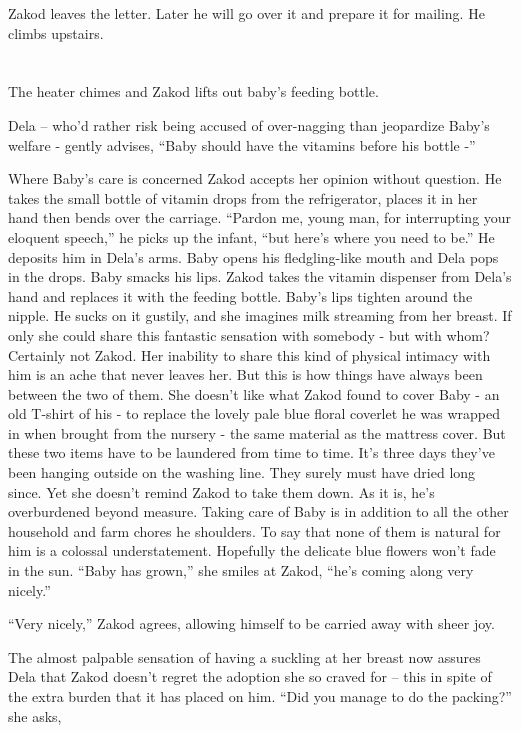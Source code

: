 \documentclass[twoside,11pt]{book}
\begin{document}
Zakod leaves the letter. Later he will go over it and prepare it for mailing. He climbs upstairs.



\chapter{}

The heater chimes and Zakod lifts out baby's feeding bottle.

Dela -- who'd rather risk being accused of over-nagging than jeopardize Baby's welfare  - gently advises,
``Baby should have the vitamins before his bottle -''

Where Baby's care is concerned Zakod accepts her opinion without question. He takes the small bottle of vitamin drops
from the refrigerator, places it in her hand then bends over the carriage. ``Pardon me, young man, for
interrupting your eloquent speech,'' he picks up the infant, ``but here's where you need to
be.'' He deposits him in Dela's arms. Baby opens his fledgling-like mouth and Dela pops in the drops. Baby
smacks his lips. Zakod takes the vitamin dispenser from Dela's hand and replaces it with the feeding bottle. Baby's
lips tighten around the nipple. He sucks on it gustily, and she imagines milk streaming from her breast. If only she
could share this fantastic sensation with somebody - but with whom? Certainly not Zakod. Her inability to share this
kind of physical intimacy with him is an ache that never leaves her. But this is how things have always been between
the two of them. She doesn't like what Zakod found to cover Baby - an old T-shirt of his - to replace the lovely pale
blue floral coverlet he was wrapped in when brought from the nursery - the same material as the mattress cover. But
these two items have to be laundered from time to time. It's three days they've been hanging outside on the washing
line. They surely must have dried long since. Yet she doesn't remind Zakod to take them down. As it is, he's
overburdened beyond measure. Taking care of Baby is in addition to all the other household and farm chores he
shoulders. To say that none of them is natural for him is a colossal understatement. Hopefully the delicate blue
flowers won't fade in the sun. ``Baby has grown,'' she smiles at Zakod, ``he's coming along very
nicely.''

``Very nicely,'' Zakod agrees, allowing himself to be carried away with sheer joy.

The almost palpable sensation of having a suckling at her breast now assures Dela that Zakod doesn't regret the
adoption she so craved for -- this in spite of the extra burden that it has placed on him. ``Did you
manage to do the packing?'' she asks,
\end{document}

